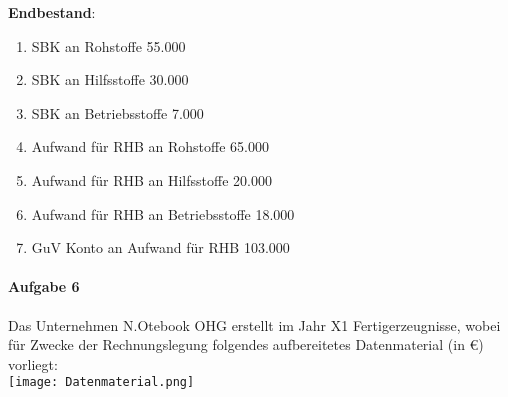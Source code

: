 \documentclass[paper=a4, fontsize=11pt]{scrartcl}
\numberwithin{equation}{section}
\numberwithin{figure}{section}
\numberwithin{table}{section}
\begin{document}
\textbf{Endbestand}:
\begin{enumerate}
\item SBK an Rohstoffe 55.000
\item SBK an Hilfsstoffe 30.000
\item SBK an Betriebsstoffe 7.000
\item Aufwand für RHB an Rohstoffe 65.000
\item Aufwand für RHB an Hilfsstoffe 20.000
\item Aufwand für RHB an Betriebsstoffe 18.000
\item GuV Konto an Aufwand für RHB 103.000
\end{enumerate}
\paragraph{Aufgabe 6}
Das Unternehmen N.Otebook OHG erstellt im Jahr X1 Fertigerzeugnisse, wobei für Zwecke der Rechnungslegung folgendes aufbereitetes Datenmaterial (in €) vorliegt: \\
\texttt{[image: Datenmaterial.png]} 
\end{document}

